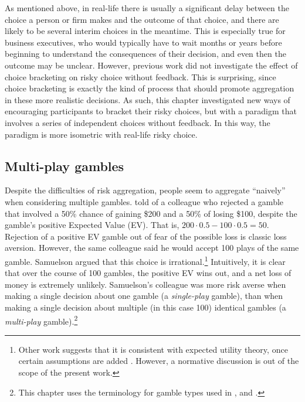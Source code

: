 \documentclass[a4paper, nobind, dvipsnames]{templates/ociamthesis}
\theoremstyle{definition}
\theoremstyle{definition}
\theoremstyle{definition}
\theoremstyle{definition}
\theoremstyle{remark}
\begin{document}
As mentioned above, in real-life there is usually a significant delay between
the choice a person or firm makes and the outcome of that choice, and there are
likely to be several interim choices in the meantime. This is especially true
for business executives, who would typically have to wait months or years before
beginning to understand the consequences of their decision, and even then the
outcome may be unclear. However, previous work did not investigate the effect of
choice bracketing on risky choice without feedback. This is surprising, since
choice bracketing is exactly the kind of process that should promote aggregation
in these more realistic decisions. As such, this chapter investigated new ways
of encouraging participants to bracket their risky choices, but with a paradigm
that involves a series of independent choices without feedback. In this way, the
paradigm is more isometric with real-life risky choice.

\subsection{Multi-play gambles}

Despite the difficulties of risk aggregation, people seem to aggregate ``naively''
when considering multiple gambles. \textcite{samuelson1963} told of a colleague who
rejected a gamble that involved a 50\% chance of gaining \$200 and a 50\% of losing
\$100, despite the gamble's positive Expected Value (EV). That is, \(200 \cdot 0.5 - 100 \cdot 0.5 = 50\). Rejection of a positive EV gamble out of fear of the
possible loss is classic loss aversion. However, the same colleague said he
would accept 100 plays of the same gamble. Samuelson argued that this choice is
irrational.\footnote{Other work suggests that it is consistent with expected utility
  theory, once certain assumptions are added \autocites[e.g.,][]{ross1999,aloysius2007}.
  However, a normative discussion is out of the scope of the present work.} Intuitively, it is clear that over the course of 100
gambles, the positive EV wins out, and a net loss of money is extremely
unlikely. Samuelson's colleague was more risk averse when making a single
decision about one gamble (a \emph{single-play} gamble), than when making a single
decision about multiple (in this case 100) identical gambles (a \emph{multi-play}
gamble).\footnote{This chapter uses the terminology for gamble types used in
  \textcite{bristow2011}, and \textcite{camilleri2013}.}
\end{document}
